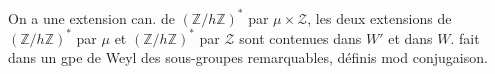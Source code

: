 On a une extension can. de $(\mathbb Z/h\mathbb Z)^*$ par $\mu\times\mathcal Z$, les deux extensions  de $(\mathbb Z/h\mathbb Z)^*$ par $\mu$ et $(\mathbb Z/h\mathbb Z)^*$ par $\mathcal Z$ sont contenues  dans $W'$ et dans $W$.  fait dans un gpe de Weyl des sous-groupes remarquables, définis mod conjugaison.
